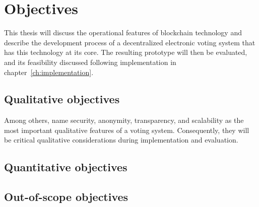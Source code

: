 \section{Objectives}\label{sec:objectives}

This thesis will discuss the operational features of blockchain technology and describe the development process of a decentralized electronic voting system that has this technology at its core.
The resulting prototype will then be evaluated, and its feasibility discussed following implementation in chapter~\ref{ch:implementation}.

\subsection{Qualitative objectives}\label{subsec:qualitative-objectives}

Among others, \textcites{lowry_desirable_2009}[5]{agora_agora_nodate}[9-11]{jafar_blockchain_2021} name security, anonymity, transparency, and scalability as the most important qualitative features of a voting system.
Consequently, they will be critical qualitative considerations during implementation and evaluation.

\subsection{Quantitative objectives}\label{subsec:quantitative-objectives}

\subsection{Out-of-scope objectives}\label{subsec:out-of-scope-objectives}


